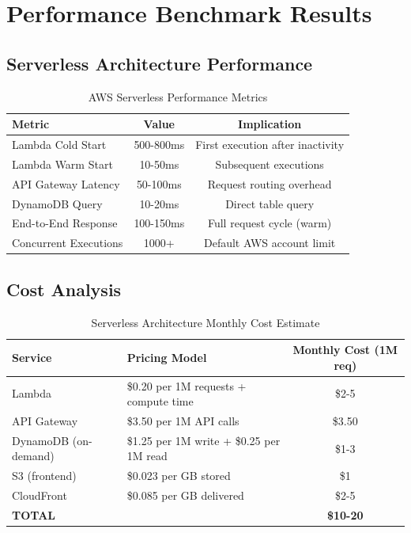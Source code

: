 \section{Performance Benchmark Results}

\subsection{Serverless Architecture Performance}

\begin{table}[h]
    \centering
    \begin{tabular}{|l|c|c|}
        \hline
        \textbf{Metric} & \textbf{Value} & \textbf{Implication} \\
        \hline
        Lambda Cold Start & 500-800ms & First execution after inactivity \\
        \hline
        Lambda Warm Start & 10-50ms & Subsequent executions \\
        \hline
        API Gateway Latency & 50-100ms & Request routing overhead \\
        \hline
        DynamoDB Query & 10-20ms & Direct table query \\
        \hline
        End-to-End Response & 100-150ms & Full request cycle (warm) \\
        \hline
        Concurrent Executions & 1000+ & Default AWS account limit \\
        \hline
    \end{tabular}
    \caption{AWS Serverless Performance Metrics}
\end{table}

\subsection{Cost Analysis}

\begin{table}[h]
    \centering
    \begin{tabularx}{\textwidth}{|l|X|c|}
        \hline
        \textbf{Service} & \textbf{Pricing Model} & \textbf{Monthly Cost (1M req)} \\
        \hline
        Lambda & \$0.20 per 1M requests + compute time & \$2-5 \\
        \hline
        API Gateway & \$3.50 per 1M API calls & \$3.50 \\
        \hline
        DynamoDB (on-demand) & \$1.25 per 1M write + \$0.25 per 1M read & \$1-3 \\
        \hline
        S3 (frontend) & \$0.023 per GB stored & \$1 \\
        \hline
        CloudFront & \$0.085 per GB delivered & \$2-5 \\
        \hline
        \textbf{TOTAL} & & \textbf{\$10-20} \\
        \hline
    \end{tabularx}
    \caption{Serverless Architecture Monthly Cost Estimate}
\end{table}

